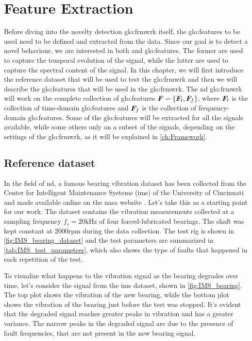 \chapter{Feature Extraction}
\label{ch:FeatureExtraction}

Before diving into the novelty detection \gls{glo:frmwrk} itself, the \gls{glo:feature}s to be used need to be defined and extracted from the data. Since our goal is to detect a novel behaviour, we are interested in both  and  \gls{glo:feature}s. The former are used to capture the temporal evolution of the signal, while the latter are used to capture the spectral content of the signal. 
In this chapter, we will first introduce the reference dataset that will be used to test the \gls{glo:frmwrk} and then we will describe the \gls{glo:feature}s that will be used in the \gls{glo:frmwrk}. The \gls{nd} \gls{glo:frmwrk} will work on the complete collection of \gls{glo:feature}s $\bm{F}=\{\bm{F}_t, \bm{F}_f\}$, where $\bm{F}_t$ is the collection of time-domain \gls{glo:feature}s and $\bm{F}_f$ is the collection of frequency-domain \gls{glo:feature}s. Some of the \gls{glo:feature}s will be extracted for all the signals available, while some others only on a subset of the signals, depending on the settings of the \gls{glo:frmwrk}, as it will be explained in \autoref{ch:Framework}. 



\section{Reference dataset}
In the field of \gls{nd}, a famous bearing vibration dataset has been collected from the Center for Intelligent Maintenance Systems (\gls{ims}) of the University of Cincinnati and made available online on the \gls{nasa} website \cite{lee2007bearingdataset}. 
Let's take this as a starting point for our work. The dataset contains the vibration measurements collected at a sampling frequency $f_s=20\si{\kHz}$ of four forced-lubricated bearings. The shaft was kept constant at $2000$rpm during the data collection. The test rig is shown in \autoref{fig:IMS_bearing_dataset} and the test parameters are summarized in \autoref{tab:IMS_test_parameters}, which also shows the type of faults that happened in each repetition of the test.

To visualize what happens to the vibration signal as the bearing degrades over time, let's consider the  signal from the \gls{ims} dataset, shown in \autoref{fig:IMS_bearing}. The top plot shows the vibration of the new bearing, while the bottom plot shows the vibration of the bearing just before the test was stopped. It's evident that the degraded signal reaches greater peaks in vibration and has a greater variance. The narrow peaks in the degraded signal are due to the presence of fault frequencies, that are not present in the new bearing signal.

